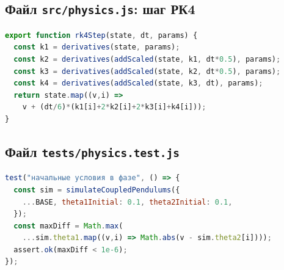 \documentclass[12pt,a4paper]{article}
\begin{document}
\subsection{Файл \texttt{src/physics.js}: шаг РК4}
\begin{lstlisting}[language=JavaScript]
export function rk4Step(state, dt, params) {
  const k1 = derivatives(state, params);
  const k2 = derivatives(addScaled(state, k1, dt*0.5), params);
  const k3 = derivatives(addScaled(state, k2, dt*0.5), params);
  const k4 = derivatives(addScaled(state, k3, dt), params);
  return state.map((v,i) =>
    v + (dt/6)*(k1[i]+2*k2[i]+2*k3[i]+k4[i]));
}
\end{lstlisting}

\subsection{Файл \texttt{tests/physics.test.js}}
\begin{lstlisting}[language=JavaScript]
test("начальные условия в фазе", () => {
  const sim = simulateCoupledPendulums({
    ...BASE, theta1Initial: 0.1, theta2Initial: 0.1,
  });
  const maxDiff = Math.max(
    ...sim.theta1.map((v,i) => Math.abs(v - sim.theta2[i])));
  assert.ok(maxDiff < 1e-6);
});
\end{lstlisting}
\end{document}
